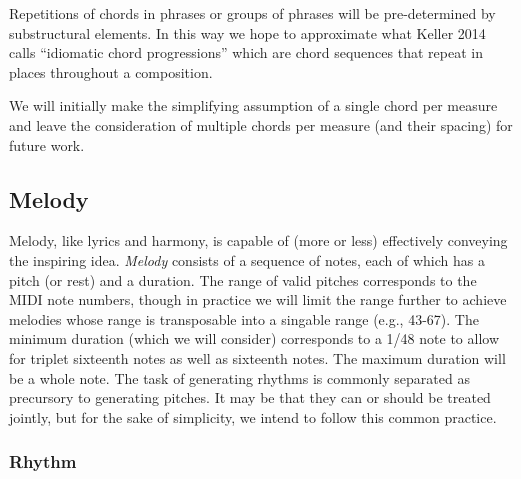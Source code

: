 \documentclass[11pt,phd]{byuprop}
\begin{document}
Repetitions of chords in phrases or groups of phrases will be pre-determined by substructural elements. In this way we hope to approximate what Keller 2014 calls ``idiomatic chord progressions'' which are chord sequences that repeat in places throughout a composition.


We will initially make the simplifying assumption of a single chord per measure and leave the consideration of multiple chords per measure (and their spacing) for future work.

\subsection{Melody}

Melody, like lyrics and harmony, is capable of (more or less) effectively conveying the inspiring idea. \emph{Melody} consists of a sequence of notes, each of which has a pitch (or rest) and a duration. The range of valid pitches corresponds to the MIDI note numbers, though in practice we will limit the range further to achieve melodies whose range is transposable into a singable range (e.g., 43-67). The minimum duration (which we will consider) corresponds to a 1/48 note to allow for triplet sixteenth notes as well as sixteenth notes. The maximum duration will be a whole note. The task of generating rhythms is commonly separated as precursory to generating pitches. It may be that they can or should be treated jointly, but for the sake of simplicity, we intend to follow this common practice.


\subsubsection{Rhythm}
\end{document}
